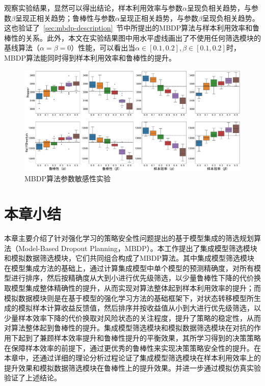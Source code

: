 观察实验结果，显然可以得出结论，样本利用效率与参数$\alpha$呈现负相关趋势，与参数$\beta$呈现正相关趋势；鲁棒性与参数$\alpha$呈现正相关趋势，与参数$\beta$呈现负相关趋势。这也验证了~\ref{sec:mbdp-description}~节中所提出的MBDP算法与样本利用效率和鲁棒性的关系。此外，本文在实验结果图中用水平虚线画出了不使用任何筛选模块的基线算法（$\alpha=\beta=0$）性能，可以看出当$\alpha\in[0.1,0.2],\beta\in[0.1,0.2]$时，MBDP算法能同时得到样本利用效率和鲁棒性的提升。

\begin{figure}[t]
  \centering
  \includegraphics[width=\textwidth]{figures/hyper-performance.pdf}
  \caption{MBDP算法参数敏感性实验}
  \label{fig:hyper-performance}
\end{figure}

\section{本章小结}

本章主要介绍了针对强化学习的策略安全性问题提出的基于模型集成的筛选规划算法（Model-Based Dropout Planning，MBDP）。本工作提出了集成模型筛选模块和模拟数据筛选模块，它们共同组合构成了MBDP算法。其中集成模型筛选模块在模型集成方法的基础上，通过计算集成模型中单个模型的预测精确度，对所有模型进行排序，然后按精确度从大到小进行优先级筛选，以少量鲁棒性下降的代价换取模型集成整体精确性的提升，从而实现对算法整体起到样本利用效率的提升；而模拟数据模块则是在基于模型的强化学习方法的基础框架下，对状态转移模型所生成的模拟样本计算收益反馈值，然后排序并按收益值从小到大进行优先级筛选，以少量样本效率下降的代价换取对风险状态的关注程度，提升了策略的稳定性，从而对算法整体起到鲁棒性的提升。集成模型筛选模块和模拟数据筛选模块在对抗的作用下起到了兼顾样本效率提升和鲁棒性提升的平衡效果，其所学习得到的决策策略在保障样本效率的前提下，通过更优秀的鲁棒性来实现决策策略安全性的提升。在本章中，还通过详细的理论分析过程论证了集成模型筛选模块在样本利用效率上的提升效果和模拟数据筛选模块在鲁棒性上的提升效果。并进一步通过模拟仿真实验验证了上述结论。